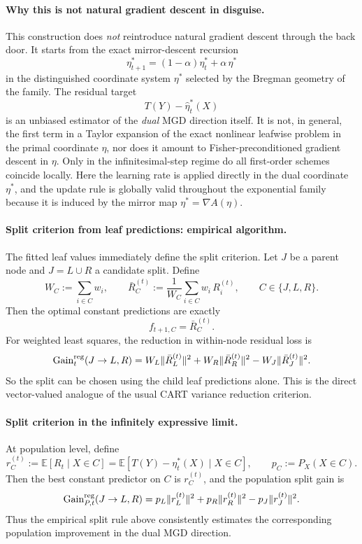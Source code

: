 \documentclass[11pt]{article}
\begin{document}
\paragraph{Why this is not natural gradient descent in disguise.}
This construction does \emph{not} reintroduce natural gradient descent through the back door. It starts from the exact mirror-descent recursion
\[
\eta^\ast_{t+1}
=
(1-\alpha)\eta^\ast_t+\alpha\,\eta^\ast
\]
in the distinguished coordinate system \(\eta^\ast\) selected by the Bregman geometry of the family. The residual target
\[
T(Y)-\hat\eta_t^\ast(X)
\]
is an unbiased estimator of the \emph{dual} MGD direction itself. It is not, in general, the first term in a Taylor expansion of the exact nonlinear leafwise problem in the primal coordinate \(\eta\), nor does it amount to Fisher-preconditioned gradient descent in \(\eta\). Only in the infinitesimal-step regime do all first-order schemes coincide locally. Here the learning rate is applied directly in the dual coordinate \(\eta^\ast\), and the update rule is globally valid throughout the exponential family because it is induced by the mirror map \(\eta^\ast=\nabla A(\eta)\).

\paragraph{Split criterion from leaf predictions: empirical algorithm.}
The fitted leaf values immediately define the split criterion. Let \(J\) be a parent node and \(J=L\cup R\) a candidate split. Define
\[
W_C:=\sum_{i\in C} w_i,
\qquad
\bar R_C^{(t)}
:=
\frac{1}{W_C}\sum_{i\in C} w_i\,R_i^{(t)},
\qquad C\in\{J,L,R\}.
\]
Then the optimal constant predictions are exactly
\[
f_{t+1,C}=\bar R_C^{(t)}.
\]
For weighted least squares, the reduction in within-node residual loss is
\[
\mathrm{Gain}^{\rm reg}_t(J\to L,R)
=
W_L\|\bar R_L^{(t)}\|^2
+
W_R\|\bar R_R^{(t)}\|^2
-
W_J\|\bar R_J^{(t)}\|^2.
\]
So the split can be chosen using the child leaf predictions alone. This is the direct vector-valued analogue of the usual CART variance reduction criterion.

\paragraph{Split criterion in the infinitely expressive limit.}
At population level, define
\[
r_C^{(t)}
:=
\mathbb E[R_t\mid X\in C]
=
\mathbb E[T(Y)-\eta_t^\ast(X)\mid X\in C],
\qquad
p_C:=P_X(X\in C).
\]
Then the best constant predictor on \(C\) is \(r_C^{(t)}\), and the population split gain is
\[
\mathrm{Gain}^{\rm reg}_{P,t}(J\to L,R)
=
p_L\|r_L^{(t)}\|^2
+
p_R\|r_R^{(t)}\|^2
-
p_J\|r_J^{(t)}\|^2.
\]
Thus the empirical split rule above consistently estimates the corresponding population improvement in the dual MGD direction.
\end{document}
